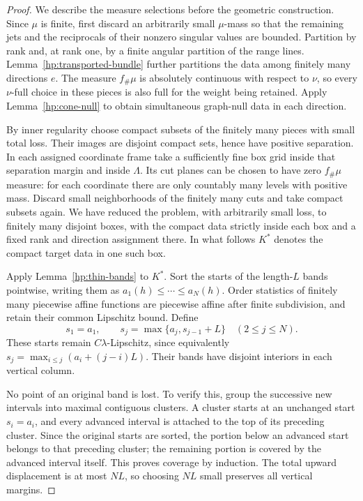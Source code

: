 \documentclass[11pt]{article}
\numberwithin{equation}{section}
\theoremstyle{definition}
\theoremstyle{remark}
\begin{document}
\begin{proof}
We describe the measure selections before the geometric construction.
Since $\mu$ is finite, first discard an arbitrarily small $\mu$-mass so
that the remaining jets and the reciprocals of their nonzero singular
values are bounded.  Partition by rank and, at rank one, by a finite
angular partition of the range lines.  Lemma~\ref{hp:transported-bundle}
further partitions the data among finitely many directions $e$.
The measure $f_\#\mu$ is absolutely continuous with respect to $\nu$,
so every $\nu$-full choice in these pieces is also full for the
weight being retained.  Apply Lemma~\ref{hp:cone-null} to obtain
simultaneous graph-null data in each direction.

By inner regularity choose compact subsets of the finitely many
pieces with small total loss.  Their images are disjoint compact
sets, hence have positive separation.  In each assigned coordinate
frame take a sufficiently fine box grid inside that separation
margin and inside $\Lambda$.  Its cut planes can be chosen to have
zero $f_\#\mu$ measure: for each coordinate there are only countably
many levels with positive mass.  Discard small neighborhoods of the
finitely many cuts and take compact subsets again.  We have reduced
the problem, with arbitrarily small loss, to finitely many disjoint
boxes, with the compact data strictly inside each box and a fixed
rank and direction assignment there.  In what follows $K^*$ denotes
the compact target data in one such box.

Apply Lemma~\ref{hp:thin-bands} to $K^*$.  Sort the starts of the
length-$L$ bands pointwise, writing them as
$a_1(h)\le\cdots\le a_N(h)$.  Order statistics of finitely many
piecewise affine functions are piecewise affine after finite
subdivision, and retain their common Lipschitz bound.  Define
\begin{equation}\label{hp:separated-band-starts}
 s_1=a_1,\qquad s_j=\max\{a_j,s_{j-1}+L\}\quad(2\le j\le N).
\end{equation}
These starts remain $C\lambda$-Lipschitz, since equivalently
$s_j=\max_{i\le j}(a_i+(j-i)L)$.  Their bands have disjoint
interiors in each vertical column.

No point of an original band is lost.  To verify this, group the
successive new intervals into maximal contiguous clusters.  A cluster
starts at an unchanged start $s_i=a_i$, and every advanced interval
is attached to the top of its preceding cluster.  Since the original
starts are sorted, the portion below an advanced start belongs to
that preceding cluster; the remaining portion is covered by the
advanced interval itself.  This proves coverage by induction.
The total upward displacement is at most $NL$, so choosing $NL$
small preserves all vertical margins.


\end{proof}
\end{document}
